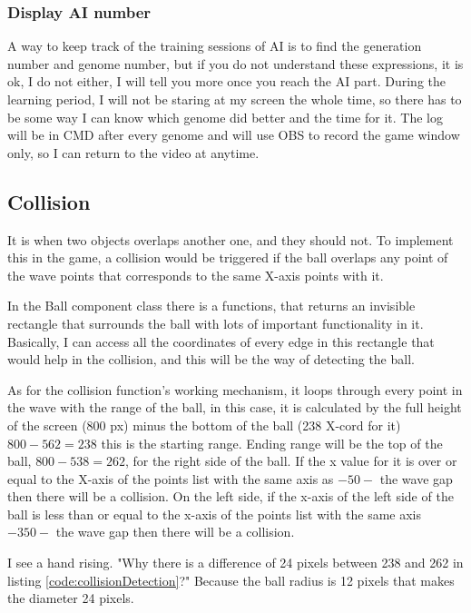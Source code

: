 \subsubsection{Display AI number}

A way to keep track of the training sessions of AI is to find the generation number and genome number, but if you do not understand these expressions, it is ok, I do not either, I will tell you more once you reach the AI part. During the learning period, I will not be staring at my screen the whole time, so there has to be some way I can know which genome did better and the time for it. The log will be in CMD after every genome and will use OBS to record the game window only, so I can return to the video at anytime.

\subsection{Collision}\label{sec:collision}
It is when two objects overlaps another one, and they should not. To implement this in the game, a collision would be triggered if the ball overlaps any point of the wave points that corresponds to the same X-axis points with it.

In the Ball component class there is a  functions, that returns an invisible rectangle that surrounds the ball with lots of important functionality in it. Basically, I can access all the coordinates of every edge in this rectangle that would help in the collision, and this will be the way of detecting the ball.

As for the collision function's working mechanism, it loops through every point in the wave with the range of the ball, in this case, it is calculated by the full height of the screen (800 px) minus the bottom of the ball (238 X-cord for it) $800-562 = 238$ this is the starting range. Ending range will be the top of the ball, $800-538 = 262$, for the right side of the ball. If the x value for it is over or equal to the X-axis of the points list with the same axis as $-50-$ the wave gap then there will be a collision. On the left side, if the x-axis of the left side of the ball is less than or equal to the x-axis of the points list with the same axis $-350-$ the wave gap then there will be a collision.

I see a hand rising. "Why there is a difference of 24 pixels between 238 and 262 in listing \ref{code:collisionDetection}?" Because the ball radius is 12 pixels that makes the diameter 24 pixels.


